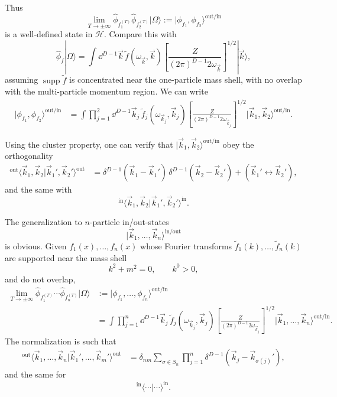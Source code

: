 Thus
\[
  \lim_{T\to\pm\infty}
  \hat\phi_{f_1^{(T)}}\hat\phi_{f_2^{(T)}}|\Omega\rangle
  :=
  |\phi_{f_1},\phi_{f_2}\rangle^{\mathrm{out/in}}
\]
is a well-defined state in \(\mathcal H\). Compare this with
\[
  \hat\phi_f|\Omega\rangle
  =
  \int\dd^{D-1}\vec k\,
  \widetilde f(\omega_{\vec k},\vec k)
  \left[
    \frac{Z}{(2\pi)^{D-1}2\omega_{\vec k}}
  \right]^{1/2}
  |\vec k\rangle ,
\]
assuming \(\operatorname{supp}\widetilde f\) is concentrated near the
one-particle mass shell, with no overlap with the multi-particle momentum
region. We can write
\[
\begin{aligned}
  |\phi_{f_1},\phi_{f_2}\rangle^{\mathrm{out/in}}
  &=
  \int\prod_{j=1}^2 \dd^{D-1}\vec k_j\,
  \widetilde f_j(\omega_{\vec k_j},\vec k_j)
  \left[
    \frac{Z}{(2\pi)^{D-1}2\omega_{\vec k_j}}
  \right]^{1/2}
  |\vec k_1,\vec k_2\rangle^{\mathrm{out/in}} .
\end{aligned}
\]

Using the cluster property, one can verify that
\(|\vec k_1,\vec k_2\rangle^{\mathrm{out/in}}\) obey the orthogonality
\[
\begin{aligned}
  {}^{\mathrm{out}}\langle
  \vec k_1,\vec k_2|\vec k_1',\vec k_2'
  \rangle^{\mathrm{out}}
  &=
  \delta^{D-1}(\vec k_1-\vec k_1')\,
  \delta^{D-1}(\vec k_2-\vec k_2')
  +(\vec k_1'\leftrightarrow\vec k_2'),
\end{aligned}
\]
and the same with
\[
  {}^{\mathrm{in}}\langle
  \vec k_1,\vec k_2|\vec k_1',\vec k_2'
  \rangle^{\mathrm{in}} .
\]

The generalization to \(n\)-particle in/out-states
\[
  |\vec k_1,\ldots,\vec k_n\rangle^{\mathrm{in/out}}
\]
is obvious. Given \(f_1(x),\ldots,f_n(x)\) whose Fourier transforms
\(\widetilde f_1(k),\ldots,\widetilde f_n(k)\) are supported near the mass
shell
\[
  k^2+m^2=0,
  \qquad
  k^0>0,
\]
and do not overlap,
\[
\begin{aligned}
  \lim_{T\to\pm\infty}
  \hat\phi_{f_1^{(T)}}\cdots\hat\phi_{f_n^{(T)}}|\Omega\rangle
  &:=
  |\phi_{f_1},\ldots,\phi_{f_n}\rangle^{\mathrm{out/in}} \\
  &=
  \int\prod_{j=1}^n \dd^{D-1}\vec k_j\,
  \widetilde f_j(\omega_{\vec k_j},\vec k_j)
  \left[
    \frac{Z}{(2\pi)^{D-1}2\omega_{\vec k_j}}
  \right]^{1/2}
  |\vec k_1,\ldots,\vec k_n\rangle^{\mathrm{out/in}} .
\end{aligned}
\]
The normalization is such that
\[
\begin{aligned}
  {}^{\mathrm{out}}\langle
  \vec k_1,\ldots,\vec k_n
  |\vec k_1',\ldots,\vec k_m'
  \rangle^{\mathrm{out}}
  &=
  \delta_{nm}
  \sum_{\sigma\in S_n}
  \prod_{j=1}^n
  \delta^{D-1}(\vec k_j-\vec k_{\sigma(j)}'),
\end{aligned}
\]
and the same for
\[
  {}^{\mathrm{in}}\langle\cdots|\cdots\rangle^{\mathrm{in}} .
\]

